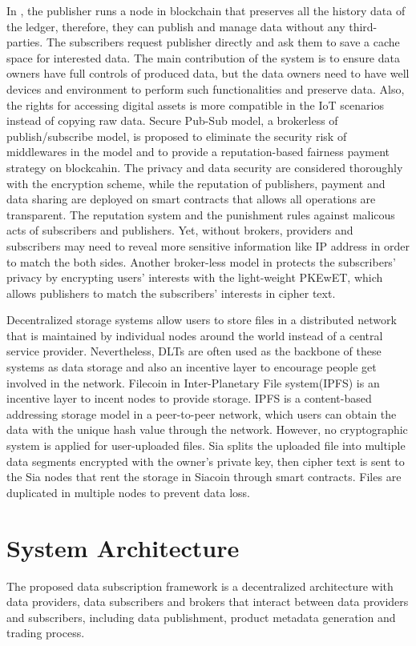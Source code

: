 \documentclass[conference]{IEEEtran}
\begin{document}
In \cite{userCentricData}, the publisher runs a node in blockchain that preserves all the history data of the ledger, therefore, they can publish and manage data without any third-parties. The subscribers request publisher directly and ask them to save a cache space for interested data. The main contribution of the system is to ensure data owners have full controls of produced data, but the data owners need to have well devices and environment to perform such functionalities and preserve data. Also, the rights for accessing digital assets is more compatible in the IoT scenarios instead of copying raw data. Secure Pub-Sub model\cite{SPS}, a brokerless of publish/subscribe model, is proposed to eliminate the security risk of middlewares in the model and to provide a reputation-based fairness payment strategy on blockcahin. The privacy and data security are considered thoroughly with the encryption scheme, while the reputation of publishers, payment and data sharing are deployed on smart contracts that allows all operations are transparent. The reputation system and the punishment rules against malicous acts of subscribers and publishers. Yet, without brokers, providers and subscribers may need to reveal more sensitive information like IP address in order to match the both sides. Another broker-less model in \cite{PrivacyPreservPubSub} protects the subscribers' privacy by encrypting users' interests with the light-weight PKEwET\cite{PKEwET}, which allows publishers to match the subscribers' interests in cipher text. 

Decentralized storage systems allow users to store files in a distributed network that is maintained by individual nodes around the world instead of a central service provider. Nevertheless, DLTs are often used as the backbone of these systems as data storage and also an incentive layer to encourage people get involved in the network. Filecoin \cite{FileCoin} in Inter-Planetary File system(IPFS)\cite{IPFS} is an incentive layer to incent nodes to provide storage. IPFS is a content-based addressing storage model in a peer-to-peer network, which users can obtain the data with the unique hash value through the network. However, no cryptographic system is applied for user-uploaded files. Sia\cite{Sia} splits the uploaded file into multiple data segments encrypted with the owner's private key, then cipher text is sent to the Sia nodes that rent the storage in Siacoin through smart contracts. Files are duplicated in multiple nodes to prevent data loss.
 
\section{System Architecture}
The proposed data subscription framework\cite{MyDataMarketplace} is a decentralized architecture with data providers, data subscribers and brokers that interact between data providers and subscribers, including data publishment, product metadata generation and trading process.
\end{document}
